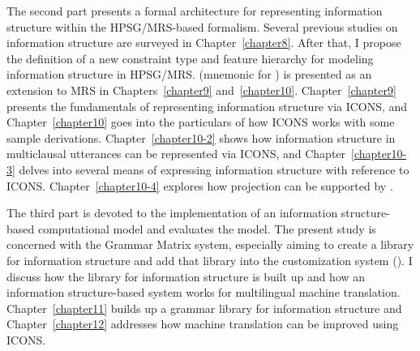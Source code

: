 The second part presents a formal architecture for representing
information structure within the HPSG/MRS-based formalism.  Several
previous studies on information structure are surveyed in
Chapter~\ref{chapter8}.  After that, I propose the definition of a new
constraint type and feature hierarchy for modeling information
structure in HPSG/MRS.  (mnemonic for ) is presented as an extension to MRS in
Chapters~\ref{chapter9} and~\ref{chapter10}.  Chapter~\ref{chapter9}
presents the fundamentals of representing information structure via
ICONS, and Chapter~\ref{chapter10} goes into the particulars of how
ICONS works with some sample derivations.  Chapter~\ref{chapter10-2}
shows how information structure in multiclausal utterances can be
represented via ICONS, and Chapter~\ref{chapter10-3} delves into
several means of expressing information structure with reference to
ICONS.  Chapter~\ref{chapter10-4} explores how  projection can be
supported by .


The third part is devoted to the implementation of an information
structure-based computational model and evaluates the model.  The
present study is concerned with the \lingo Grammar Matrix system,
especially aiming to create a library for information structure and
add that library into the customization system
(\citealt{bender:flickinger:05,drellishak:09,bender:etal:10}). I
discuss how the library for information structure is built up and how
an information structure-based system works for multilingual machine
translation.  Chapter~\ref{chapter11} builds up a grammar library for
information structure and Chapter~\ref{chapter12} addresses how
machine translation can be improved using ICONS.


